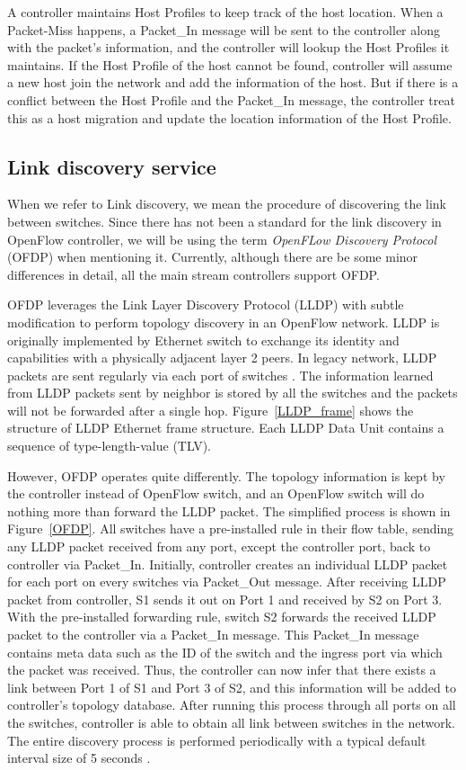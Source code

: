 A controller maintains Host Profiles to keep track of the host location. When a Packet-Miss happens, a Packet\_In message will be sent to the controller along with the packet's information, and the controller will lookup the Host Profiles it maintains. If the Host Profile of the host cannot be found, controller will assume a new host join the network and add the information of the host. But if there is a conflict between the Host Profile and the Packet\_In message, the controller treat this as a host migration and update the location information of the Host Profile.

\subsection{Link discovery service}
\label{Link discovery service}
When we refer to Link discovery, we mean the procedure of discovering the link between switches. Since there has not been a standard for the link discovery in OpenFlow controller, we will be using the term \textit{OpenFLow Discovery Protocol} (OFDP) when mentioning it. Currently, although there are be some minor differences in detail, all the main stream controllers support OFDP.

OFDP leverages the Link Layer Discovery Protocol (LLDP) with subtle modification to perform topology discovery in an OpenFlow network. LLDP is originally implemented by Ethernet switch to exchange its identity and capabilities with a physically adjacent layer 2 peers. In legacy network, LLDP packets are sent regularly via each port of switches \cite{LLDP_WS}. The information learned from LLDP packets sent by neighbor is stored by all the switches and the packets will not be forwarded after a single hop. Figure~\ref{LLDP_frame} shows the structure of LLDP Ethernet frame structure. Each LLDP Data Unit contains a sequence of type-length-value (TLV). 

However, OFDP operates quite differently. The topology information is kept by the controller instead of OpenFlow switch, and an OpenFlow switch will do nothing more than forward the LLDP packet. The simplified process is shown in Figure~\ref{OFDP}. All switches have a pre-installed rule in their flow table, sending any LLDP packet received from any port, except the controller port, back to controller via Packet\_In. Initially, controller creates an individual LLDP packet for each port on every switches via Packet\_Out message. After receiving LLDP packet from controller, S1 sends it out on Port 1 and received by S2 on Port 3. With the pre-installed forwarding rule, switch S2 forwards the received LLDP packet to the controller via a Packet\_In message. This Packet\_In message contains meta data such as the ID of the switch and the ingress port via which the packet was received. Thus, the controller can now infer that there exists a link between Port 1 of S1 and Port 3 of S2, and this information will be added to controller's topology database. After running this process through all ports on all the switches, controller is able to obtain all link between switches in the network. The entire discovery process is performed periodically with a typical default interval size of 5 seconds \cite{PPTI14}. 


